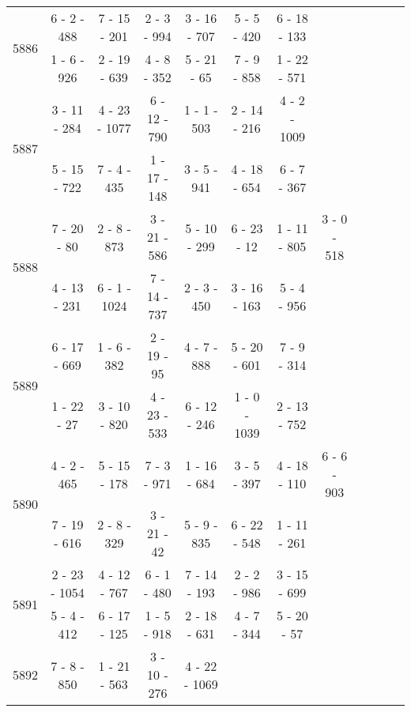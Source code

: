 \begin{longtable}{c | c | c | c | c | c | c | c | c | c | c | c}
\multirow{2}{*}{5886}
& 6 - 2 - 488
&
7 - 15 - 201
&
2 - 3 - 994
&
3 - 16 - 707
&
5 - 5 - 420
&
6 - 18 - 133
&\space\\* \space
&
1 - 6 - 926
&
2 - 19 - 639
&
4 - 8 - 352
&
5 - 21 - 65
&
7 - 9 - 858
&
1 - 22 - 571
&\space\\\hline
\multirow{2}{*}{5887}
& 3 - 11 - 284
&
4 - 23 - 1077
&
6 - 12 - 790
&
1 - 1 - 503
&
2 - 14 - 216
&
4 - 2 - 1009
&\space\\* \space
&
5 - 15 - 722
&
7 - 4 - 435
&
1 - 17 - 148
&
3 - 5 - 941
&
4 - 18 - 654
&
6 - 7 - 367
&\space\\\hline
\multirow{2}{*}{5888}
& 7 - 20 - 80
&
2 - 8 - 873
&
3 - 21 - 586
&
5 - 10 - 299
&
6 - 23 - 12
&
1 - 11 - 805
&
3 - 0 - 518
\\* \space
&
4 - 13 - 231
&
6 - 1 - 1024
&
7 - 14 - 737
&
2 - 3 - 450
&
3 - 16 - 163
&
5 - 4 - 956
&\space\\\hline
\multirow{2}{*}{5889}
& 6 - 17 - 669
&
1 - 6 - 382
&
2 - 19 - 95
&
4 - 7 - 888
&
5 - 20 - 601
&
7 - 9 - 314
&\space\\* \space
&
1 - 22 - 27
&
3 - 10 - 820
&
4 - 23 - 533
&
6 - 12 - 246
&
1 - 0 - 1039
&
2 - 13 - 752
&\space\\\hline
\multirow{2}{*}{5890}
& 4 - 2 - 465
&
5 - 15 - 178
&
7 - 3 - 971
&
1 - 16 - 684
&
3 - 5 - 397
&
4 - 18 - 110
&
6 - 6 - 903
\\* \space
&
7 - 19 - 616
&
2 - 8 - 329
&
3 - 21 - 42
&
5 - 9 - 835
&
6 - 22 - 548
&
1 - 11 - 261
&\space\\\hline
\multirow{2}{*}{5891}
& 2 - 23 - 1054
&
4 - 12 - 767
&
6 - 1 - 480
&
7 - 14 - 193
&
2 - 2 - 986
&
3 - 15 - 699
&\space\\* \space
&
5 - 4 - 412
&
6 - 17 - 125
&
1 - 5 - 918
&
2 - 18 - 631
&
4 - 7 - 344
&
5 - 20 - 57
&\space\\\hline
\multirow{2}{*}{5892}
& 7 - 8 - 850
&
1 - 21 - 563
&
3 - 10 - 276
&
4 - 22 - 1069
&

\end{longtable}
